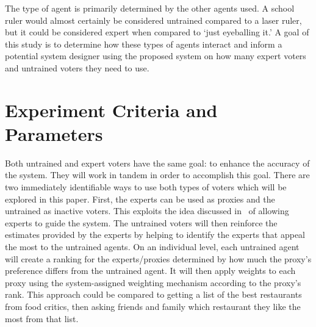 The type of agent is primarily determined by the other agents used.
A school ruler would almost certainly be considered untrained compared to a laser ruler,
but it could be considered expert when compared to `just eyeballing it.'
A goal of this study is to determine how these types of
agents interact and inform a potential system designer using the proposed system on
how many expert voters and untrained voters they need to use.


\section{Experiment Criteria and Parameters}
\label{sec:experiment-criteria-and-parameters}
Both untrained and expert voters have the same goal: to enhance the accuracy of
the system.
They will work in tandem in order to accomplish this goal.
There are two immediately identifiable ways to use both types of voters which
will be explored in this paper.
First, the experts can be used as proxies and the untrained as inactive voters.
This exploits the idea discussed in~\cite{Miller1969, Mueller1972} of
allowing experts to guide the system.
The untrained voters will then reinforce the estimates provided by the experts by
helping to identify the experts that appeal the most to the untrained agents.
On an individual level, each untrained agent will create a ranking for the
experts/proxies determined by how much the proxy's preference differs from the
untrained agent.
It will then apply weights to each proxy using the system-assigned weighting mechanism
according to the proxy's rank.
This approach could be compared to getting a list of the best restaurants from food
critics, then asking friends and family which restaurant they like the most from
that list.

